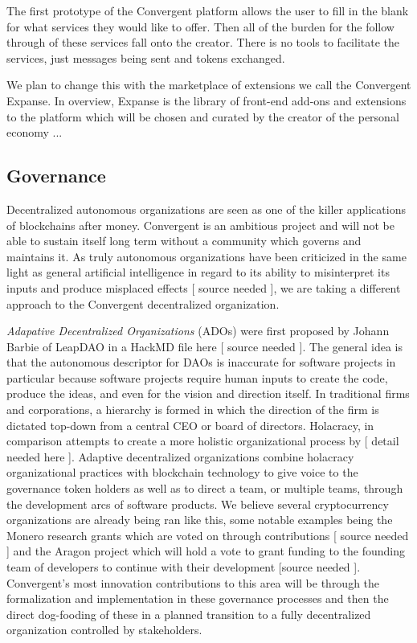 \documentclass[a4paper, 10pt]{article}
\begin{document}
The first prototype of the Convergent platform allows the user to fill in the blank for what services they would like to offer. Then all of the burden for the follow through of these services fall onto the creator. There is no tools to facilitate the services, just messages being sent and tokens exchanged.

We plan to change this with the marketplace of extensions we call the Convergent Expanse. In overview, Expanse is the library of front-end add-ons and extensions to the platform which will be chosen and curated by the creator of the personal economy ...

\subsection{Governance}

Decentralized autonomous organizations are seen as one of the killer applications of blockchains after money. Convergent is an ambitious project and will not be able to sustain itself long term without a community which governs and maintains it. As truly autonomous organizations have been criticized in the same light as general artificial intelligence in regard to its ability to misinterpret its inputs and produce misplaced effects [ source needed ], we are taking a different approach to the Convergent decentralized organization.

\textit{Adapative Decentralized Organizations} (ADOs) were first proposed by Johann Barbie of LeapDAO in a HackMD file here [ source needed ]. The general idea is that the autonomous descriptor for DAOs is inaccurate for software projects in particular because software projects require human inputs to create the code, produce the ideas, and even for the vision and direction itself. In traditional firms and corporations, a hierarchy is formed in which the direction of the firm is dictated top-down from a central CEO or board of directors. Holacracy, in comparison attempts to create a more holistic organizational process by [ detail needed here ]. Adaptive decentralized organizations combine holacracy organizational practices with blockchain technology to give voice to the governance token holders as well as to direct a team, or multiple teams, through the development arcs of software products. We believe several cryptocurrency organizations are already being ran like this, some notable examples being the Monero research grants which are voted on through contributions [ source needed ] and the Aragon project which will hold a vote to grant funding to the founding team of developers to continue with their development [source needed ]. Convergent's most innovation contributions to this area will be through the formalization and implementation in these governance processes and then the direct dog-fooding of these in a planned transition to a fully decentralized organization controlled by stakeholders.
\end{document}
